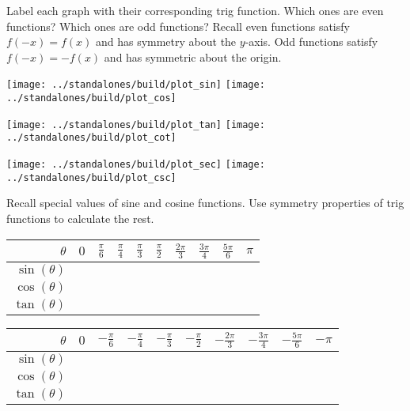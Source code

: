 \documentclass[../main.tex]{subfiles}
\begin{document}
  \begin{example}
    Label each graph with their corresponding trig function. Which ones are even functions? Which ones are odd functions?  \newline
    {\footnotesize Recall even functions satisfy \(f(-x) = f(x)\) and has symmetry about the \(y\)-axis. Odd functions satisfy \(f(-x) = -f(x)\) and has symmetric about the origin.}

    \begin{center}
      \texttt{[image: ../standalones/build/plot\_sin]}
      \hspace{0.5in}
      \texttt{[image: ../standalones/build/plot\_cos]}
    \end{center}
    \vfill{}

    \begin{center}
      \texttt{[image: ../standalones/build/plot\_tan]}
      \hspace{0.5in}
      \texttt{[image: ../standalones/build/plot\_cot]}
    \end{center}
    \vfill{}

    \begin{center}
      \texttt{[image: ../standalones/build/plot\_sec]}
      \hspace{0.5in}
      \texttt{[image: ../standalones/build/plot\_csc]}
    \end{center}
    \vfill{}
  \end{example}

  \begin{example}
    Recall special values of sine and cosine functions. Use symmetry properties of trig functions to calculate the rest.

    \begin{tabular}{r|p{1cm}|p{1cm}|p{1cm}|p{1cm}|p{1cm}|p{1cm}|p{1cm}|p{1cm}|p{1cm}}
      \(\theta\) & \(0\) & \(\frac{\pi}{6}\) & \(\frac{\pi}{4}\) & \(\frac{\pi}{3}\) & \(\frac{\pi}{2}\) & \(\frac{2\pi}{3}\) & \(\frac{3\pi}{4}\) & \(\frac{5\pi}{6}\) & \(\pi\) \\\midrule
      \(\sin(\theta)\) &&&&&&&&&\\[3ex]\midrule
      \(\cos(\theta)\) &&&&&&&&&\\[3ex]\midrule
      \(\tan(\theta)\) &&&&&&&&&\\[3ex]
    \end{tabular}

    \begin{tabular}{r|p{1cm}|p{1cm}|p{1cm}|p{1cm}|p{1cm}|p{1cm}|p{1cm}|p{1cm}|p{1cm}}
      \(\theta\) & \(0\) & \(-\frac{\pi}{6}\) & \(-\frac{\pi}{4}\) & \(-\frac{\pi}{3}\) & \(-\frac{\pi}{2}\) & \(-\frac{2\pi}{3}\) & \(-\frac{3\pi}{4}\) & \(-\frac{5\pi}{6}\) & \(-\pi\) \\\midrule
      \(\sin(\theta)\) &&&&&&&&&\\[3ex]\midrule
      \(\cos(\theta)\) &&&&&&&&&\\[3ex]\midrule
      \(\tan(\theta)\) &&&&&&&&&\\[3ex]
    \end{tabular}
  \end{example}
  \vfill{}

  \clearpage
\end{document}
